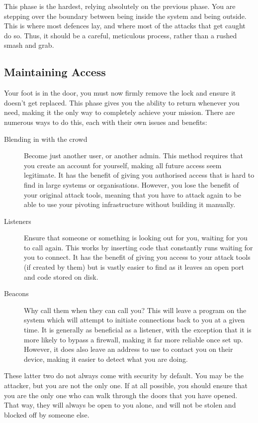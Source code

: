 			This phase is the hardest, relying absolutely on the previous phase. 
			You are stepping over the boundary between being inside the system and being outside. 
			This is where most defences lay, and where most of the attacks that get caught do so. 
			Thus, it should be a careful, meticulous process, rather than a rushed smash and grab. 
		\subsection{Maintaining Access}
			Your foot is in the door, you must now firmly remove the lock and ensure it doesn't get replaced. 
			This phase gives you the ability to return whenever you need, making it the only way to completely achieve your mission. 
			There are numerous ways to do this, each with their own issues and benefits:
			\begin{description}
				\item[Blending in with the crowd] Become just another user, or another admin. 
					This method requires that you create an account for yourself, making all future access seem legitimate. 
					It has the benefit of giving you authorised access that is hard to find in large systems or organisations. 
					However, you lose the benefit of your original attack tools, meaning that you have to attack again to be able to use your pivoting infrastructure without building it manually. 
				\item[Listeners] Ensure that someone or something is looking out for you, waiting for you to call again. 
					This works by inserting code that constantly runs waiting for you to connect. 
					It has the benefit of giving you access to your attack tools (if created by them) 
					but is vastly easier to find as it leaves an open port and code stored on disk. 
				\item[Beacons] Why call them when they can call you?
					This will leave a program on the system which will attempt to initiate connections back to you at a given time. 
					It is generally as beneficial as a listener, with the exception that it is more likely to bypass a firewall, 
					making it far more reliable once set up. 
					However, it does also leave an address to use to contact you on their device, making it easier to detect what you are doing. 
			\end{description}
			These latter two do not always come with security by default. 
			You may be the attacker, but you are not the only one. 
			If at all possible, you should ensure that you are the only one who can walk through the doors that you have opened. 
			That way, they will always be open to you alone, and will not be stolen and blocked off by someone else. 
			
